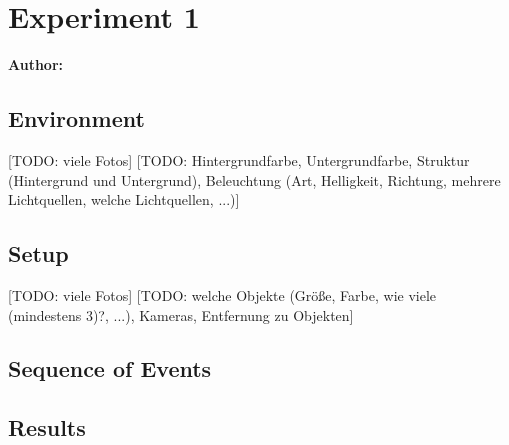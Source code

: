\chapter{Experiment 1}

\textbf{Author: } 

\section{Environment}
[TODO: viele Fotos]
[TODO: Hintergrundfarbe, Untergrundfarbe, Struktur (Hintergrund und Untergrund), Beleuchtung (Art, Helligkeit, Richtung, mehrere Lichtquellen, welche Lichtquellen, ...)]

\section{Setup}
[TODO: viele Fotos]
[TODO: welche Objekte (Größe, Farbe, wie viele (mindestens 3)?, ...), Kameras, Entfernung zu Objekten]

\section{Sequence of Events}

\section{Results}

\filbreak
